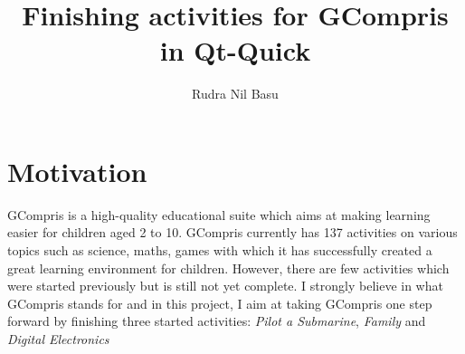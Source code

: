\documentclass[preprint,12pt]{elsarticle}
\begin{document}
\begin{frontmatter}



\title{Finishing activities for GCompris in Qt-Quick}


\author{Rudra Nil Basu}

\address{ \textbf{Email ID}: rudra.nil.basu.1996@gmail.com}
\address{ \textbf{Freenode IRC Nick}: rudra}
\address{ \textbf{Location}: Kolkata, West Bengal, India UTC+5.30}

\end{frontmatter}


\section{Motivation}
\label{S:1}


GCompris is a high-quality educational suite which aims at making learning easier for children aged 2 to 10. GCompris currently has 137 activities on various topics such as science, maths, games with which it has successfully created a great learning environment for children. However, there are few activities which were started previously but is still not yet complete. I strongly believe in what GCompris stands for and in this project, I aim at taking GCompris one step forward by finishing three started activities: \textit{Pilot a Submarine}, \textit{Family} and \textit{Digital Electronics}
\end{document}
